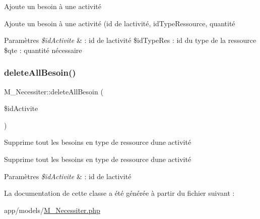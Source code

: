 Ajoute un besoin à une activité 

Ajoute un besoin à une activité (id de l\textquotesingle{}activité, id\+Type\+Ressource, quantité 
\begin{DoxyParams}{Paramètres}
{\em \$id\+Activite} & \+: id de l\textquotesingle{}activité \$id\+Type\+Res \+: id du type de la ressource \$qte \+: quantité nécessaire \\
\hline
\end{DoxyParams}
\mbox{\label{class_m___necessiter_a6495c131e77c83063ec7e632e0336d9e}} 
\subsubsection{\texorpdfstring{delete\+All\+Besoin()}{deleteAllBesoin()}}
{\footnotesize\ttfamily M\+\_\+\+Necessiter\+::delete\+All\+Besoin (\begin{DoxyParamCaption}\item[{}]{\$id\+Activite }\end{DoxyParamCaption})}



Supprime tout les besoins en type de ressource d\textquotesingle{}une activité 

Supprime tout les besoins en type de ressource d\textquotesingle{}une activité 
\begin{DoxyParams}{Paramètres}
{\em \$id\+Activite} & \+: id de l\textquotesingle{}activité \\
\hline
\end{DoxyParams}


La documentation de cette classe a été générée à partir du fichier suivant \+:\begin{DoxyCompactItemize}
\item 
app/models/\hyperlink{_m___necessiter_8php}{M\+\_\+\+Necessiter.\+php}\end{DoxyCompactItemize}
